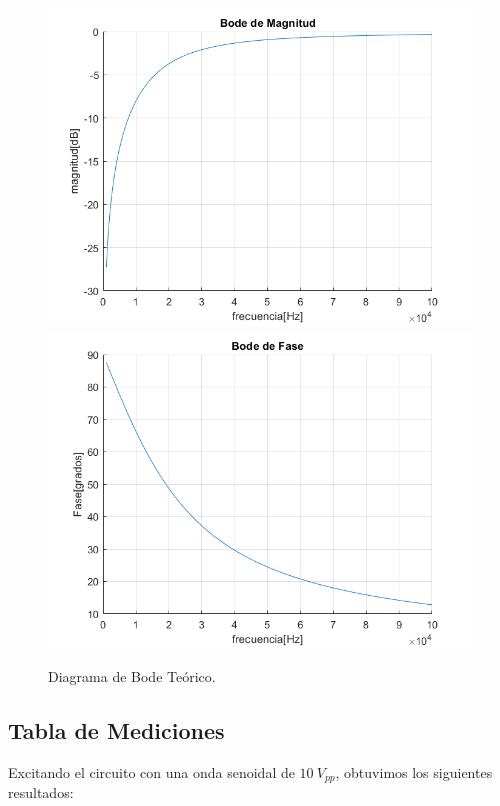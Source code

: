 \begin{figure}[h!]
\centering
\includegraphics[scale=0.5]{2teomag.png}
\includegraphics[scale=0.5]{2teofase.png}
\caption{Diagrama de Bode Teórico.}
\label{fig:CR}
\end{figure}

\subsection{Tabla de Mediciones}

Excitando el circuito con una onda senoidal de $10~V_{pp}$, obtuvimos los siguientes resultados:


